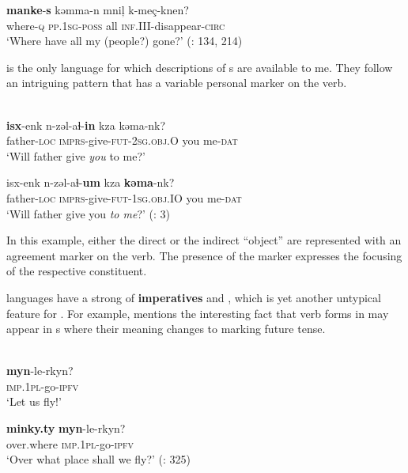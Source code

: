     \ex
    \gll \textbf{{manke}}-\textbf{{s}} kǝmma-n  mni\c{l}  k-meç-knen?\\
    where-\textsc{q}  \textsc{pp}.1\textsc{sg}-\textsc{poss}  all  \textsc{inf}.III-disappear-\textsc{circ}\\
    \glt ‘Where have all my (people?) gone?’ (\citealt{GeorgVolodin1999}: 134, 214)
    \z
    \z

 is the only  language for which descriptions of s are available to me. They follow an intriguing pattern that has a variable personal marker on the verb.

\ea%
    \label{ex:chuk:9}
    \\
    \ea
    \gll \textbf{{isx}}-enk    n-zǝl-aɬ-\textbf{{in}} kza  kǝma-nk?\\
    father-\textsc{loc}  \textsc{imprs}-give-\textsc{fut}-2\textsc{sg}.\textsc{obj.O}  you  me-\textsc{dat}\\
    \glt ‘Will father give \textit{you} to me?’

    \ex
    \gll isx-enk    n-zǝl-aɬ-\textbf{{um}} kza \textbf{{kǝma}}-nk?\\
    father-\textsc{loc}  \textsc{imprs}-give-\textsc{fut}-1\textsc{sg}.\textsc{obj.IO}  you  me-\textsc{dat}\\
    \glt ‘Will father give you \textit{to me}?’ (\citealt{Bobaljik2002}: 3)
    \z
    \z

\noindent In this example, either the direct or the indirect “object” are represented with an agreement marker on the verb. The presence of the marker expresses the focusing of the respective constituent.

 languages have a strong  of \textbf{imperatives} and , which is yet another untypical feature for . For example, \citet[325]{Nedjalkov1994} mentions the interesting fact that  verb forms in  may appear in s where their meaning changes to marking future tense.

\ea%
    \label{ex:chuk:10}
    \ea
    \\
    \gll \textbf{{myn}}-le-rkyn?\\
    \textsc{imp}.1\textsc{pl}-go-\textsc{ipfv}\\
    \glt ‘Let us fly!’

    \ex
    \gll\textbf{{minky.ty}} \textbf{{myn}}-le-rkyn?\\
    over.where  \textsc{imp}.1\textsc{pl}-go-\textsc{ipfv}\\
    \glt ‘Over what place shall we fly?’ (\citealt{Nedjalkov1994}: 325)
    \z
    \z

